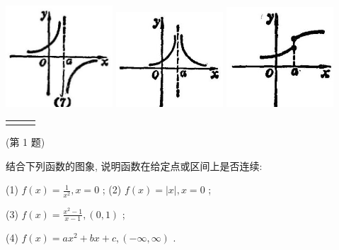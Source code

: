 \documentclass[lang=cn,newtx,10pt,scheme=chinese]{elegantbook}
\begin{document}
\begin{problemset}[练习]
\begin{center}
	\includegraphics[max width=0.3\textwidth]{images/01912c18-5c3f-733d-b775-749ba9897a9d_36_255638.jpg}
	\includegraphics[max width=0.3\textwidth]{images/01912c18-5c3f-733d-b775-749ba9897a9d_36_333878.jpg}
	\includegraphics[max width=0.3\textwidth]{images/01912c18-5c3f-733d-b775-749ba9897a9d_36_561922.jpg}
\end{center}

\noindent %
\begin{tabular}{ccc}
	\makebox[0.3\textwidth][c]{(7)} &
	\makebox[0.3\textwidth][c]{(8)} &
	\makebox[0.3\textwidth][c]{(9)}
\end{tabular}


(第 1 题)

\item 结合下列函数的图象, 说明函数在给定点或区间上是否连续:

(1) \(f\left( x\right) = \frac{1}{{x}^{2}},x = 0\) ; (2) \(f\left( x\right) = \left| x\right| ,x = 0\) ;

(3) \(f\left( x\right) = \frac{{x}^{2} - 1}{x - 1},\left( {0,1}\right)\) ;

(4) \(f\left( x\right) = a{x}^{2} + {bx} + c,\left( {-\infty ,\infty }\right)\) .

\end{problemset}
\end{document}
